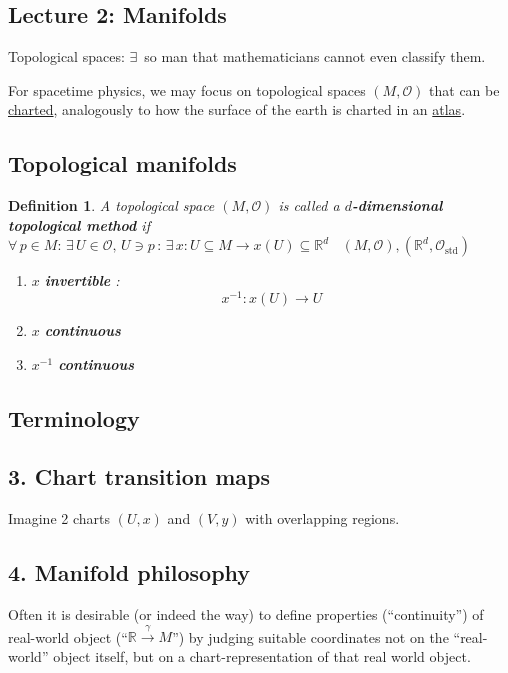 \documentclass[10pt]{amsart}
\newtheorem{definition}{Definition}
\begin{document}
\begin{multicols*}{2}
\subsection*{Lecture 2: Manifolds}

Topological spaces: $\exists \,$ so man that mathematicians cannot even classify them. 

For spacetime physics, we may focus on topological spaces $(M,\mathcal{O})$ that can be \underline{charted}, analogously to how the surface of the earth is charted in an \underline{atlas}.

\subsection{Topological manifolds}

\begin{definition}
	A topological space $(M,\mathcal{O})$ is called a \textbf{$d$-dimensional topological method} if \\
	$\forall \, p \in M : \, \exists \, U \in \mathcal{O}, \, U \ni p \, : \, \exists \, x : U \subseteq M \to x(U) \subseteq \mathbb{R}^d$  \quad \quad \, $(M,\mathcal{O}), ( \mathbb{R}^d , \mathcal{O}_{\text{std}})$ 
	\begin{enumerate}
		\item[(i)] $x$ \textbf{ invertible }: 
		\[
		x^{-1}:x(U) \to U
		\]
		\item[(ii)] $x$ \textbf{ continuous }
		\item[(iii)] $x^{-1}$ \textbf{ continuous }
	\end{enumerate}
\end{definition}

\subsection{Terminology}

\subsection{3. Chart transition maps}

Imagine 2 charts $(U,x)$ and $(V,y)$ with overlapping regions.  

\subsection{4. Manifold philosophy}

Often it is desirable (or indeed the way) to define properties (``continuity'') of real-world object (``$\mathbb{R}\xrightarrow{ \gamma } M$'') by judging suitable coordinates not on the ``real-world'' object itself, but on a chart-representation of that real world object.  


\end{multicols*}
\end{document}
